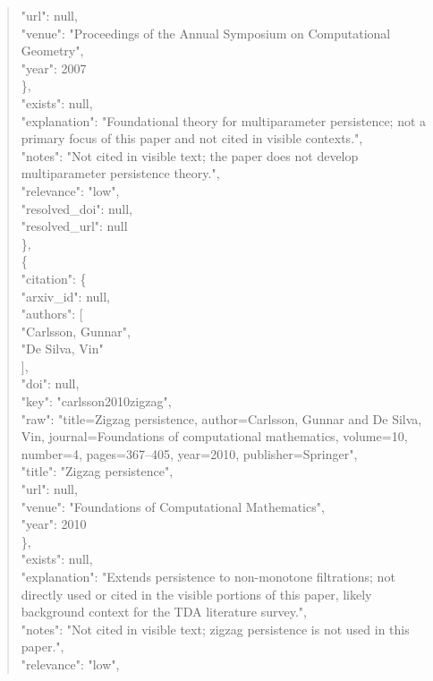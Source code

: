 \documentclass[11pt]{article}
\begin{document}
\begin{quote}
        "url": null,\\
        "venue": "Proceedings of the Annual Symposium on Computational Geometry",\\
        "year": 2007\\
      \},\\
      "exists": null,\\
      "explanation": "Foundational theory for multiparameter persistence; not a primary focus of this paper and not cited in visible contexts.",\\
      "notes": "Not cited in visible text; the paper does not develop multiparameter persistence theory.",\\
      "relevance": "low",\\
      "resolved\_doi": null,\\
      "resolved\_url": null\\
    \},\\
    \{\\
      "citation": \{\\
        "arxiv\_id": null,\\
        "authors": [\\
          "Carlsson, Gunnar",\\
          "De Silva, Vin"\\
        ],\\
        "doi": null,\\
        "key": "carlsson2010zigzag",\\
        "raw": "title=Zigzag persistence, author=Carlsson, Gunnar and De Silva, Vin, journal=Foundations of computational mathematics, volume=10, number=4, pages=367--405, year=2010, publisher=Springer",\\
        "title": "Zigzag persistence",\\
        "url": null,\\
        "venue": "Foundations of Computational Mathematics",\\
        "year": 2010\\
      \},\\
      "exists": null,\\
      "explanation": "Extends persistence to non-monotone filtrations; not directly used or cited in the visible portions of this paper, likely background context for the TDA literature survey.",\\
      "notes": "Not cited in visible text; zigzag persistence is not used in this paper.",\\
      "relevance": "low",\\

\end{quote}
\end{document}
